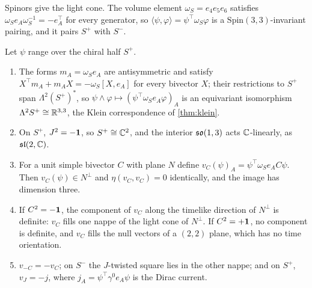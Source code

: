 Spinors give the light cone. The volume element $\omega_S=e_4e_5e_6$ satisfies $\omega_Se_A\omega_S^{-1}=-e_A^{\!\top}$ for every generator, so
$\langle\psi,\varphi\rangle=\psi^{\!\top}\omega_S\varphi$ is a $\mathrm{Spin}(3,3)$-invariant pairing, and it pairs $S^+$ with $S^-$.

\begin{theorem}
\label{thm:cone}
Let $\psi$ range over the chiral half $S^+$.
\begin{enumerate}[label=(\roman*),leftmargin=2.2em]
\item The forms $m_A=\omega_Se_A$ are antisymmetric and satisfy $X^{\!\top}m_A+m_AX=-\omega_S[X,e_A]$ for every bivector $X$; their restrictions to $S^+$ span
$\Lambda^2(S^+)^*$, so $\psi\wedge\varphi\mapsto(\psi^{\!\top}\omega_Se_A\varphi)_A$ is an equivariant isomorphism $\Lambda^2S^+\cong\mathbb{R}^{3,3}$, the Klein correspondence of
\cref{thm:klein}.
\item On $S^+$, $J^2=-\mathbf 1$, so $S^+\cong\mathbb{C}^2$, and the interior $\mathfrak{so}(1,3)$ acts $\mathbb{C}$-linearly, as $\mathfrak{sl}(2,\mathbb{C})$.
\item For a unit simple bivector $C$ with plane $N$ define $v_C(\psi)_A=\psi^{\!\top}\omega_Se_AC\psi$. Then $v_C(\psi)\in N^\perp$ and $\eta(v_C,v_C)=0$ identically,
and the image has dimension three.
\item If $C^2=-\mathbf 1$, the component of $v_C$ along the timelike direction of $N^\perp$ is definite: $v_C$ fills one nappe of the light cone of $N^\perp$. If
$C^2=+\mathbf 1$, no component is definite, and $v_C$ fills the null vectors of a $(2,2)$ plane, which has no time orientation.
\item $v_{-C}=-v_C$; on $S^-$ the $J$-twisted square lies in the other nappe; and on $S^+$, $v_J=-j$, where $j_A=\psi^{\!\top}\gamma^0e_A\psi$ is the Dirac current.
\end{enumerate}
\end{theorem}

